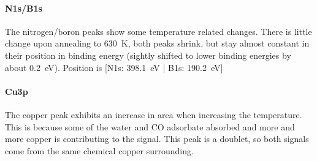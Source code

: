 \paragraph{N1s/B1s}
The nitrogen/boron peaks show some temperature related changes. There is little change upon annealing to \SI{630}{\K}, both peaks shrink, but stay almost constant in their position in binding energy (sightly shifted to lower binding energies by about \SI{0.2}{\eV}). Position is [N1s: \SI{398.1}{\eV} | B1s: \SI{190.2}{\eV}]

\paragraph{Cu3p}
The copper peak exhibits an increase in area when increasing the temperature. This is because some of the water and CO adsorbate absorbed and more and more copper is contributing to the signal. This peak is a doublet, so both signals come from the same chemical copper surrounding.


